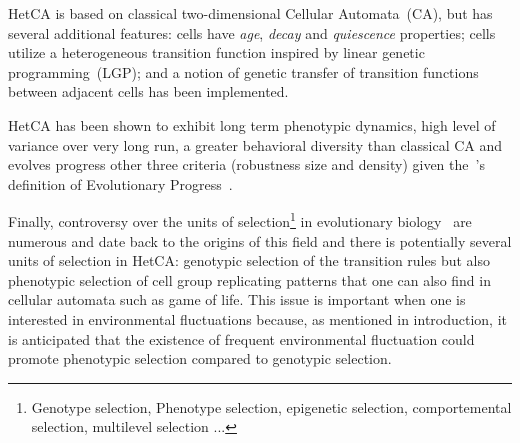 HetCA is based on classical two-dimensional Cellular Automata~(CA), but has several additional features: cells have \emph{age}, \emph{decay} and \emph{quiescence} properties; cells utilize a heterogeneous transition function inspired by linear genetic programming~(LGP); and  a notion of genetic transfer of transition functions between adjacent cells has been implemented.

HetCA has been shown to exhibit long term phenotypic dynamics, high level of variance over very long run, a greater behavioral diversity than classical CA and evolves progress other three criteria (robustness size and density) given the~\cite{shanahan2012evolutionary}'s definition of Evolutionary Progress~\citep{medernach2015evolutionary}.


Finally, controversy over the units of selection\footnote{Genotype selection, Phenotype selection, epigenetic selection, comportemental selection, multilevel selection \cite{lloyd2012unitsandlevelsofselection}...} in evolutionary biology~\citep{okasha2006evolution} are numerous and date back to the origins of this field  and there is potentially several units of selection in HetCA: genotypic selection of the transition rules but also phenotypic selection of cell group replicating patterns that one can also find in cellular automata such as game of life.  This issue is important when one is interested in environmental fluctuations because, as mentioned in introduction, it is anticipated that the existence of frequent environmental fluctuation could promote phenotypic selection compared to genotypic selection.


